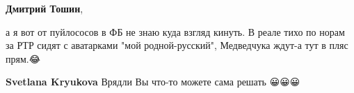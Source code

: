 \begin{itemize}
\begin{itemize}
 
\textbf{Дмитрий Тошин}, 

а я вот от пуйлососов в ФБ не знаю куда взгляд кинуть. В реале тихо по норам за
РТР сидят с аватарками "мой родной-русский", Медведчука ждут-а тут в пляс
прям.😂

 
\textbf{Svetlana Kryukova}
Врядли Вы что-то можете сама решать 😀😀😀


\end{itemize}


\end{itemize}

